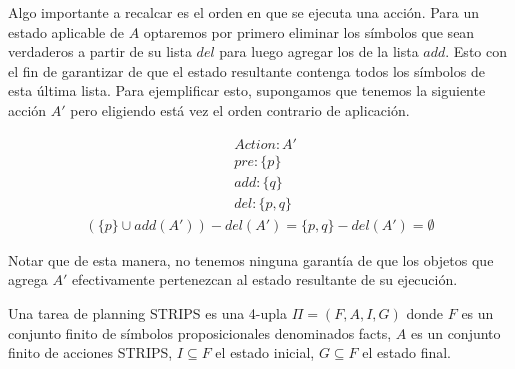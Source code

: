 Algo importante a recalcar es el orden en que se ejecuta una acción. Para un
estado aplicable de $A$ optaremos por primero eliminar los símbolos que sean
verdaderos a partir de su lista $del$ para luego agregar los de la lista $add$.
Esto con el fin de garantizar de que el estado resultante contenga todos los
símbolos de esta última lista. Para ejemplificar esto, supongamos que tenemos la
siguiente acción $A'$ pero eligiendo está vez el orden contrario de aplicación.

\begin{align*}
    & Action : A' \\
    & pre : \{ p \}\\
    & add : \{ q \}\\
    & del : \{ p, q \}
\end{align*}
\begin{align*}
    (\{p\} \cup add(A')) - del(A') = \{p, q\} - del(A') = \emptyset
\end{align*}

Notar que de esta manera, no tenemos ninguna garantía de que los objetos que
agrega $A'$ efectivamente pertenezcan al estado resultante de su ejecución.

\begin{mydef}
    Una tarea de planning STRIPS es una 4-upla $\Pi = (F, A, I, G)$ donde $F$ es
    un conjunto finito de símbolos proposicionales denominados facts, $A$ es un
    conjunto finito de acciones STRIPS, $I \subseteq F$ el estado inicial, $G
    \subseteq F$ el estado final.
\end{mydef}

